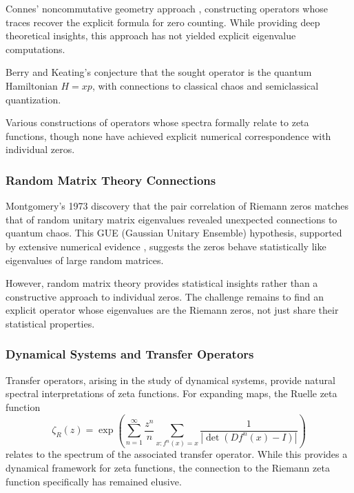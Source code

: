 \documentclass[12pt,letterpaper]{article}
\theoremstyle{plain}
\theoremstyle{definition}
\theoremstyle{remark}
\begin{document}
Connes' noncommutative geometry approach \cite{connes1998}, constructing operators whose traces recover the explicit formula for zero counting. While providing deep theoretical insights, this approach has not yielded explicit eigenvalue computations.

Berry and Keating's conjecture \cite{berry1999} that the sought operator is the quantum Hamiltonian $H = xp$, with connections to classical chaos and semiclassical quantization.

Various constructions of operators whose spectra formally relate to zeta functions, though none have achieved explicit numerical correspondence with individual zeros.

\subsubsection{Random Matrix Theory Connections}

Montgomery's 1973 discovery \cite{montgomery1973} that the pair correlation of Riemann zeros matches that of random unitary matrix eigenvalues revealed unexpected connections to quantum chaos. This GUE (Gaussian Unitary Ensemble) hypothesis, supported by extensive numerical evidence \cite{odlyzko1987}, suggests the zeros behave statistically like eigenvalues of large random matrices.

However, random matrix theory provides statistical insights rather than a constructive approach to individual zeros. The challenge remains to find an explicit operator whose eigenvalues are the Riemann zeros, not just share their statistical properties.

\subsubsection{Dynamical Systems and Transfer Operators}

Transfer operators, arising in the study of dynamical systems, provide natural spectral interpretations of zeta functions. For expanding maps, the Ruelle zeta function
\begin{equation}\label{eq:ruelle_zeta}
\zeta_R(z) = \exp\left(\sum_{n=1}^{\infty} \frac{z^n}{n} \sum_{x: f^n(x)=x} \frac{1}{|\det(Df^n(x) - I)|}\right)
\end{equation}
relates to the spectrum of the associated transfer operator. While this provides a dynamical framework for zeta functions, the connection to the Riemann zeta function specifically has remained elusive.
\end{document}
